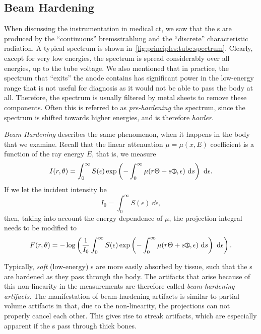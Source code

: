 \documentclass[../ml-ct.tex]{subfiles}
\begin{document}
\subsection{Beam Hardening}
When discussing the instrumentation in medical \gls{ct}, we saw that the \xray{}s are produced by the \enquote{continuous} bremsstrahlung and the \enquote{discrete} characteristic radiation.
A typical spectrum is shown in~\cref{fig:principles:tube:spectrum}.
Clearly, except for very low energies, the spectrum is spread considerably over all energies, up to the tube voltage.
We also mentioned that in practice, the spectrum that \enquote{exits} the anode contains has significant power in the low-energy range that is not useful for diagnosis as it would not be able to pass the body at all.
Therefore, the spectrum is usually filtered by metal sheets to remove these components.
Often this is referred to as \emph{pre-hardening} the spectrum, since the spectrum is shifted towards higher energies, and is therefore \emph{harder}.

\emph{Beam Hardening} describes the same phenomenon, when it happens in the body that we examine.
Recall that the linear attenuation \( \mu = \mu(x, E) \) coefficient is a function of the ray energy \( E \), that is, we measure
\begin{equation}
	I(r, \theta) = \int_0^\infty S(\epsilon) \exp\left( -\int_0^\infty \mu(r\tcs + s\tcsperp, \epsilon)\ \dd s \right)\ \dd \epsilon.
\end{equation}
If we let the incident intensity be
\begin{equation}
	I_0 = \int_0^\infty S(\epsilon)\ \dd \epsilon,
\end{equation}
then, taking into account the energy dependence of \( \mu \), the projection integral needs to be modified to
\begin{equation}
	F(r, \theta) = -\log \left( \frac{1}{I_0} \int_0^\infty S(\epsilon) \exp\left( -\int_0^\infty \mu(r\tcs + s\tcsperp, \epsilon)\ \dd s \right)\ \dd \epsilon \right).
\end{equation}

Typically, \emph{soft} (low-energy) \xray{}s are more easily absorbed by tissue, such that the \xray{}s are hardened as they pass through the body.
The artifacts that arise because of this non-linearity in the measurements are therefore called \emph{beam-hardening artifacts}.
The manifestation of beam-hardening artifacts is similar to partial volume artifacts in that, due to the non-linearity, the projections can not properly cancel each other.
This gives rise to streak artifacts, which are especially apparent if the \xray{}s pass through thick bones.
\end{document}

